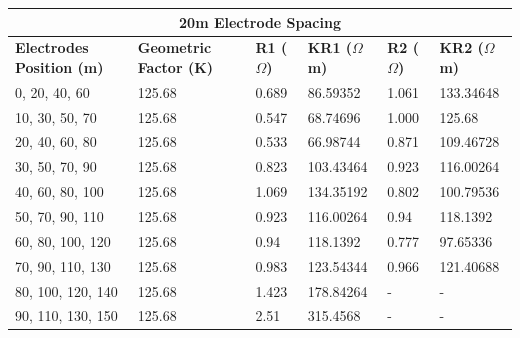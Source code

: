 \documentclass[12pt,a4paper]{report}
\begin{document}
\begin{itemize}
\begin{table}[H]
    \centering
    \begin{adjustbox}{max width=\textwidth}
    \setlength{\tabcolsep}{15pt}
    \renewcommand{\arraystretch}{1.5}
    \begin{tabular}{|p{3.0cm}|p{2.5cm}|p{1.8cm}|p{3.5cm}|p{1.8cm}|p{3.5cm}|}
    \hline
    \multicolumn{6}{|c|}{\rule{0pt}{2em}\huge\textbf{20m Electrode Spacing}} \\
    \hline
    \textbf{Electrodes Position (m)} & \textbf{Geometric Factor (K)} & \textbf{R1 ($\Omega$)} & \textbf{KR1 ($\Omega$m)} & \textbf{R2 ($\Omega$)} & \textbf{KR2 ($\Omega$m)}  \\ \hline
    0, 20, 40, 60 & 125.68 & 0.689 & 86.59352 & 1.061 & 133.34648 \\ \hline
    10, 30, 50, 70 & 125.68 & 0.547 & 68.74696 & 1.000 & 125.68 \\ \hline
    20, 40, 60, 80 & 125.68 & 0.533 & 66.98744 & 0.871 & 109.46728 \\ \hline
    30, 50, 70, 90 & 125.68 & 0.823 & 103.43464 & 0.923 & 116.00264 \\ \hline
    40, 60, 80, 100 & 125.68 & 1.069 & 134.35192 & 0.802 & 100.79536 \\ \hline
    50, 70, 90, 110 & 125.68 & 0.923 & 116.00264 & 0.94 & 118.1392 \\ \hline
    60, 80, 100, 120 & 125.68 & 0.94 & 118.1392 & 0.777 & 97.65336 \\ \hline
    70, 90, 110, 130 & 125.68 & 0.983 & 123.54344 & 0.966 & 121.40688 \\ \hline
    80, 100, 120, 140 & 125.68 & 1.423 & 178.84264 & - & - \\ \hline
    90, 110, 130, 150 & 125.68 & 2.51 & 315.4568 & - & - \\ \hline
    \end{tabular}
\end{adjustbox}
\end{table}


\end{itemize}
\end{document}

